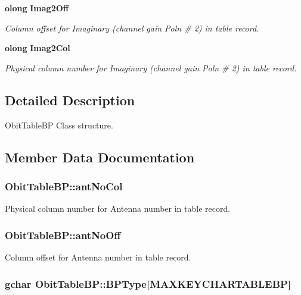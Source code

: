 \begin{CompactItemize}
{\bf olong} {\bf Imag2Off}
\begin{CompactList}\small\item\em Column offset for Imaginary (channel gain Poln \# 2) in table record. \item\end{CompactList}\item 
{\bf olong} {\bf Imag2Col}
\begin{CompactList}\small\item\em Physical column number for Imaginary (channel gain Poln \# 2) in table record. \item\end{CompactList}\end{CompactItemize}


\subsection{Detailed Description}
Obit\-Table\-BP Class structure. 



\subsection{Member Data Documentation}
\subsubsection{ {\bf Obit\-Table\-BP::ant\-No\-Col}}\label{structObitTableBP_o33}


Physical column number for Antenna number in table record. 

\subsubsection{ {\bf Obit\-Table\-BP::ant\-No\-Off}}\label{structObitTableBP_o32}


Column offset for Antenna number in table record. 

\subsubsection{\setlength{\rightskip}{0pt plus 5cm}gchar {\bf Obit\-Table\-BP::BPType}[MAXKEYCHARTABLEBP]}\label{structObitTableBP_o23}


